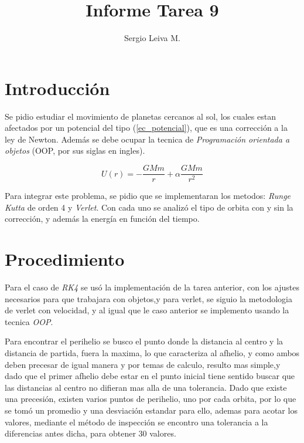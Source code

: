 \documentclass[10pt]{article}
\begin{document}
\author{Sergio Leiva M.}
\title{\textbf{Informe Tarea 9}}
\date{}
\maketitle

\thispagestyle{firstpage}


\section{Introducción}

Se pidio estudiar el movimiento de planetas cercanos al sol, los cuales estan afectados por un potencial del tipo (\ref{ec_potencial}), que es una corrección a la ley de Newton. Además se debe ocupar la tecnica de \textit{Programación orientada a objetos} (OOP, por sus siglas en ingles). 

\begin{equation}
U(r)=-\dfrac{GMm}{r}+\alpha \dfrac{GMm}{r^2}
\label{ec_potencial}
\end{equation}
  
  Para integrar este problema, se pidio que se implementaran los metodos: \textit{Runge Kutta} de orden 4 y \textit{Verlet}. Con cada uno se analizó el tipo de orbita con y sin la corrección, y además la energía en función del tiempo.
  
\section{Procedimiento}

Para el caso de \textit{RK4} se usó la implementación de la tarea anterior, con los ajustes necesarios para que trabajara con objetos,y para verlet, se siguio la metodologia de verlet con velocidad, y al igual que le caso anterior se implemento usando la tecnica \textit{OOP}.

Para encontrar el perihelio se busco el punto donde la distancia al centro y la distancia de partida, fuera la maxima, lo que caracteriza al afhelio, y como ambos deben precesar de igual manera y por temas de calculo, resulto mas simple,y dado que el primer afhelio debe estar en el punto inicial tiene sentido buscar que las distancias al centro no difieran mas alla de una tolerancia. Dado que existe una precesión, existen varios puntos de perihelio, uno por cada orbita, por lo que se tomó un promedio y una desviación estandar para ello, ademas para acotar los valores, mediante el método de inspección se encontro una tolerancia a la diferencias antes dicha, para obtener 30 valores.
\end{document}

